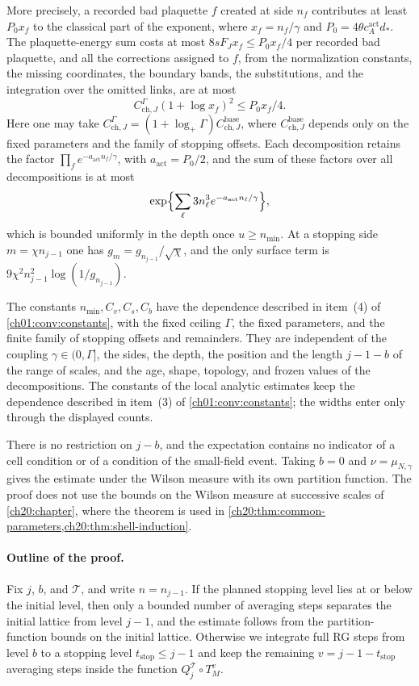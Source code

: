 \begin{theorem}
More precisely, a recorded bad plaquette $f$ created at side $n_f$ contributes at least $P_0x_f$ to the classical part of the exponent, where $x_f=n_f/\gamma$ and $P_0=4\theta c_A^{\mathrm{act}}d_*$. The plaquette-energy sum costs at most $8sF_Jx_f\le P_0x_f/4$ per recorded bad plaquette, and all the corrections assigned to $f$, from the normalization constants, the missing coordinates, the boundary bands, the substitutions, and the integration over the omitted links, are at most
\[
 C_{\mathrm{ch},J}^{\Gamma}(1+\log x_f)^2\le P_0x_f/4.
\]
Here one may take $C_{\mathrm{ch},J}^{\Gamma}=(1+\log_+\Gamma)C_{\mathrm{ch},J}^{\mathrm{base}}$, where $C_{\mathrm{ch},J}^{\mathrm{base}}$ depends only on the fixed parameters and the family of stopping offsets. Each decomposition retains the factor $\prod_fe^{-a_{\mathrm{act}}n_f/\gamma}$, with $a_{\mathrm{act}}=P_0/2$, and the sum of these factors over all decompositions is at most
\[
 \exp\Bigl\{\sum_\ell3n_\ell^3e^{-a_{\mathrm{act}}n_\ell/\gamma}\Bigr\},
\]
which is bounded uniformly in the depth once $u\ge n_{\min}$. At a stopping side $m=\chi n_{j-1}$ one has $g_m=g_{n_{j-1}}/\sqrt\chi$, and the only surface term is $9\chi^2n_{j-1}^2\log(1/g_{n_{j-1}})$.

The constants $n_{\min},C_v,C_s,C_b$ have the dependence described in item~(4) of \cref{ch01:conv:constants}, with the fixed ceiling $\Gamma$, the fixed parameters, and the finite family of stopping offsets and remainders. They are independent of the coupling $\gamma\in(0,\Gamma]$, the sides, the depth, the position and the length $j-1-b$ of the range of scales, and the age, shape, topology, and frozen values of the decompositions. The constants of the local analytic estimates keep the dependence described in item~(3) of \cref{ch01:conv:constants}; the widths enter only through the displayed counts.
\end{theorem}

\begin{remark}
There is no restriction on $j-b$, and the expectation contains no indicator of a cell condition or of a condition of the small-field event. Taking $b=0$ and $\nu=\mu_{N,\gamma}$ gives the estimate under the Wilson measure with its own partition function. The proof does not use the bounds on the Wilson measure at successive scales of \cref{ch20:chapter}, where the theorem is used in \cref{ch20:thm:common-parameters,ch20:thm:shell-induction}.
\end{remark}

\paragraph{Outline of the proof.}
Fix $j$, $b$, and $\mathcal T$, and write $n=n_{j-1}$. If the planned stopping level lies at or below the initial level, then only a bounded number of averaging steps separates the initial lattice from level $j-1$, and the estimate follows from the partition-function bounds on the initial lattice. Otherwise we integrate full RG steps from level $b$ to a stopping level $t_{\mathrm{stop}}\le j-1$ and keep the remaining $v=j-1-t_{\mathrm{stop}}$ averaging steps inside the function $Q_j^{\mathcal T}\circ T_M^v$.

